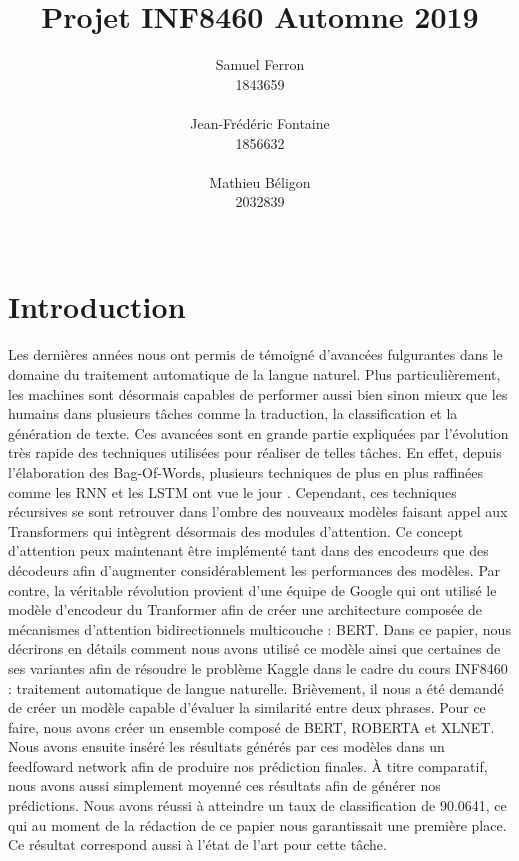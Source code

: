 \documentclass[11pt,a4paper, french]{article}
\title{Projet INF8460 Automne 2019 }
\author{Samuel Ferron \\
  1843659 \\
  {\tt } \\\And
  Jean-Frédéric Fontaine \\
  1856632 \\
  {\tt} \\\And
  Mathieu B\'eligon \\
  2032839\\
  {\tt } \\}
\date{}
\begin{document}
\maketitle

\section{Introduction}
Les dernières années nous ont permis de témoigné d’avancées fulgurantes dans le domaine du traitement automatique de la langue naturel. Plus particulièrement, les machines sont désormais capables de performer aussi bien sinon mieux que les humains dans plusieurs tâches comme la traduction, la classification et la génération de texte. Ces avancées sont en grande partie expliquées par l’évolution très rapide des techniques utilisées pour réaliser de telles tâches. En effet, depuis l’élaboration des Bag-Of-Words, plusieurs techniques de plus en plus raffinées comme les RNN et les LSTM ont vue le jour \cite{lstm}. Cependant, ces techniques récursives se sont retrouver dans l’ombre des nouveaux modèles faisant appel aux Transformers qui intègrent désormais des modules d’attention. Ce concept d’attention peux maintenant être implémenté tant dans des encodeurs que des décodeurs afin d’augmenter considérablement les performances des modèles. Par contre, la véritable révolution provient d’une équipe de Google qui ont utilisé le modèle d’encodeur du Tranformer afin de créer une architecture composée de mécanismes d’attention bidirectionnels multicouche : BERT. Dans ce papier, nous décrirons en détails comment nous avons utilisé ce modèle ainsi que certaines de ses variantes afin de résoudre le problème Kaggle dans le cadre du cours INF8460 : traitement automatique de langue naturelle. Brièvement, il nous a été demandé de créer un modèle capable d’évaluer la similarité entre deux phrases. Pour ce faire, nous avons créer un ensemble composé de BERT, ROBERTA et XLNET. Nous avons ensuite inséré les résultats générés par ces modèles dans un feedfoward network afin de produire nos prédiction finales. À titre comparatif, nous avons aussi simplement moyenné ces résultats afin de générer nos prédictions. Nous avons réussi à atteindre un taux de classification de 90.0641, ce qui au moment de la rédaction de ce papier nous garantissait une première place. Ce résultat correspond aussi à l'état de l'art pour cette tâche. 
\end{document}
